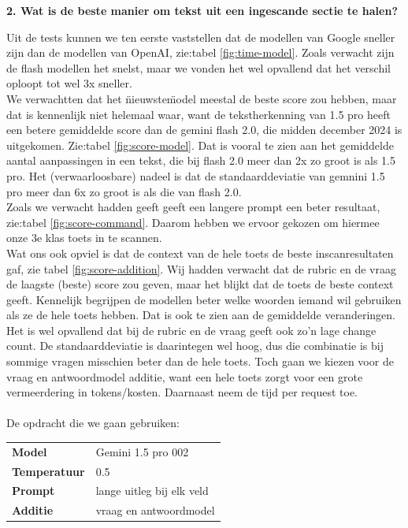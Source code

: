\documentclass[12pt]{article}
\begin{document}
\pagebreak
\noindent\textbf{2. Wat is de beste manier om tekst uit een ingescande sectie te halen?}
\begin{multicols}{2}
Uit de tests kunnen we ten eerste vaststellen dat de modellen van Google sneller zijn dan de modellen van OpenAI, zie:tabel \ref{fig:time-model}. Zoals verwacht zijn de flash modellen het snelst, maar we vonden het wel opvallend dat het verschil oploopt tot wel 3x sneller. \\
\indent We verwachtten dat het \"nieuwste\" model meestal de beste score zou hebben, maar dat is kennenlijk niet helemaal waar, want de tekstherkenning van 1.5 pro heeft een betere gemiddelde score dan de gemini flash 2.0, die midden december 2024 is uitgekomen. Zie:tabel \ref{fig:score-model}. Dat is vooral te zien aan het gemiddelde aantal aanpassingen in een tekst, die bij flash 2.0 meer dan 2x zo groot is als 1.5 pro. Het (verwaarloosbare) nadeel is dat de standaarddeviatie van gemnini 1.5 pro meer dan 6x zo groot is als die van flash 2.0. \\
\indent Zoals we verwacht hadden geeft geeft een langere prompt een beter resultaat, zie:tabel \ref{fig:score-command}. Daarom hebben we ervoor gekozen om hiermee onze 3e klas toets in te scannen. \\
\indent Wat ons ook opviel is dat de context van de hele toets de beste inscanresultaten gaf, zie tabel \ref{fig:score-addition}. Wij hadden verwacht dat de rubric en de vraag de laagste (beste) score zou geven, maar het blijkt dat de toets de beste context geeft. Kennelijk begrijpen de modellen beter welke woorden iemand wil gebruiken als ze de hele toets hebben. Dat is ook te zien aan de gemiddelde veranderingen. Het is wel opvallend dat bij de rubric en de vraag geeft ook zo'n lage change count. De standaarddeviatie is daarintegen wel hoog, dus die combinatie is bij sommige vragen misschien beter dan de hele toets. Toch gaan we kiezen voor de vraag en antwoordmodel additie, want een hele toets zorgt voor een grote vermeerdering in tokens/kosten. Daarnaast neem de tijd per request toe.\\
\\
\noindent De opdracht die we gaan gebruiken:\\
\begin{tabularx}{\textwidth}{ll}
    \textbf{Model} & Gemini 1.5 pro 002 \\
    \textbf{Temperatuur} & 0.5 \\
    \textbf{Prompt} & lange uitleg bij elk veld \\
    \textbf{Additie} & vraag en antwoordmodel \\
\end{tabularx}

\end{multicols}
\pagebreak
\end{document}
